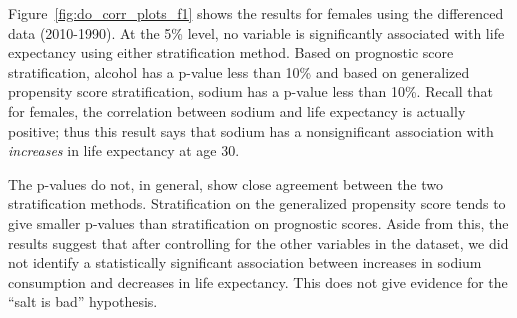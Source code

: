 \documentclass[11pt]{article}\usepackage[]{graphicx}\usepackage[]{color}
\begin{document}
Figure~\ref{fig:do_corr_plots_f1} shows the results for females using the differenced data (2010-1990).
At the 5\% level, no variable is significantly associated with life expectancy using either stratification method.
Based on prognostic score stratification, alcohol has a p-value less than 10\% and 
based on generalized propensity score stratification, sodium has a p-value less than 10\%.
Recall that for females, the correlation between sodium and life expectancy is actually positive; 
thus this result says that sodium has a nonsignificant association with \textit{increases} in life expectancy at age 30.

The p-values do not, in general, show close agreement between the two stratification methods.
Stratification on the generalized propensity score tends to give smaller p-values than stratification on prognostic scores.
Aside from this, the results suggest that after controlling for the other variables in the dataset, we did not identify a statistically significant association between increases in sodium consumption and decreases in life expectancy.
This does not give evidence for the ``salt is bad'' hypothesis.

\clearpage
\end{document}

